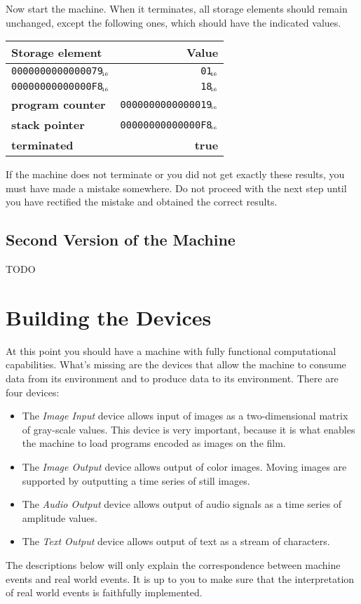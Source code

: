 \documentclass[a4paper,11pt]{article}
\newcommand{\PC}{\textbf{program counter}\xspace}
\newcommand{\SP}{\textbf{stack pointer}\xspace}
\newcommand{\TERM}{\textbf{terminated}\xspace}
\newcommand{\T}{\textbf{true}\xspace}
\newcommand{\num}[1]{\texttt{#1}\xspace}
\newcommand{\hex}[1]{\num{#1}$_{\textup{\tiny\hskip-1ex 16}}$\xspace}
\begin{document}
Now start the machine.
When it terminates, all storage elements should remain unchanged, except the following ones, which should have the indicated values.

\begin{center}
  \begin{tabular}{@{}lr@{}}
    \hline
    Storage element        & Value                   \\
    \hline
    \hex{0000000000000079} & \hex{01}                \\
    \hex{00000000000000F8} & \hex{18}                \\
    \PC                    & \hex{0000000000000019}  \\
    \SP                    & \hex{00000000000000F8}  \\
    \TERM                  & \T                      \\
    \hline
  \end{tabular}
\end{center}


If the machine does not terminate or you did not get exactly these results, you must have made a mistake somewhere.
Do not proceed with the next step until you have rectified the mistake and obtained the correct results.

\subsection{Second Version of the Machine}

TODO

\section{Building the Devices}
\label{sec:building-devices}

At this point you should have a machine with fully functional computational capabilities.
What's missing are the devices that allow the machine to consume data from its environment and to produce data to its environment.
There are four devices:
\begin{itemize}
\item The \emph{Image Input} device allows input of images as a two-dimensional matrix of gray-scale values.
  This device is very important, because it is what enables the machine to load programs encoded as images on the film.
\item The \emph{Image Output} device allows output of color images.
  Moving images are supported by outputting a time series of still images.
\item The \emph{Audio Output} device allows output of audio signals as a time series of amplitude values.
\item The \emph{Text Output} device allows output of text as a stream of characters.
\end{itemize}
The descriptions below will only explain the correspondence between machine events and real world events.
It is up to you to make sure that the interpretation of real world events is faithfully implemented.
\end{document}
